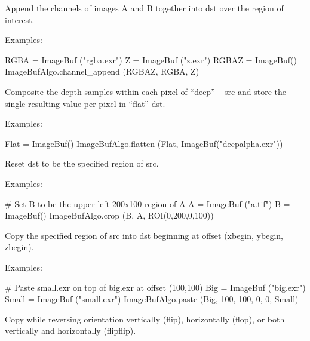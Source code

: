  
Append the channels of images {\cf A} and {\cf B} together into {\cf dst} over
the region of interest.

\smallskip
\noindent Examples:
\begin{code}
    RGBA = ImageBuf ("rgba.exr")
    Z = ImageBuf ("z.exr")
    RGBAZ = ImageBuf()
    ImageBufAlgo.channel_append (RGBAZ, RGBA, Z)
\end{code}
\apiend


  

Composite the depth samples within each pixel of ``deep'' \ImageBuf\ {\cf
src} and store the single  resulting value per pixel in ``flat'' \ImageBuf
{\cf dst}.

\smallskip
\noindent Examples:
\begin{code}
    Flat = ImageBuf()
    ImageBufAlgo.flatten (Flat, ImageBuf("deepalpha.exr"))
\end{code}
\apiend


 
Reset {\cf dst} to be the specified region of {\cf src}.

\smallskip
\noindent Examples:
\begin{code}
    # Set B to be the upper left 200x100 region of A
    A = ImageBuf ("a.tif")
    B = ImageBuf()
    ImageBufAlgo.crop (B, A, ROI(0,200,0,100))
\end{code}
\apiend


 
Copy the specified region of {\cf src} into {\cf dst} beginning at 
offset {\cf (xbegin, ybegin, zbegin)}.

\smallskip
\noindent Examples:
\begin{code}
    # Paste small.exr on top of big.exr at offset (100,100)
    Big = ImageBuf ("big.exr")
    Small = ImageBuf ("small.exr")
    ImageBufAlgo.paste (Big, 100, 100, 0, 0, Small)
\end{code}
\apiend


 
 
 
Copy while reversing orientation vertically (flip), horizontally (flop),
or both vertically and horizontally (flipflip).

